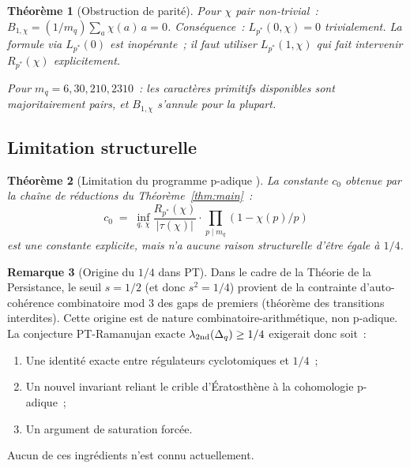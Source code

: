 \documentclass[11pt,a4paper]{article}
\newtheorem{theorem}{Théorème}[section]
\theoremstyle{definition}
\newtheorem{remark}[theorem]{Remarque}
\begin{document}
\begin{theorem}[Obstruction de parité]
\label{thm:parity_obstruction}
Pour $\chi$ pair non-trivial~: $B_{1,\chi} = (1/m_q)\sum_a \chi(a)\,a = 0$.
Conséquence~: $L_{p^*}(0,\chi) = 0$ trivialement. La formule via
$L_{p^*}(0)$ est inopérante~; il faut utiliser $L_{p^*}(1,\chi)$ qui
fait intervenir $R_{p^*}(\chi)$ explicitement.

\smallskip\noindent
Pour $m_q = 6, 30, 210, 2310$~: les caractères primitifs disponibles
sont majoritairement pairs, et $B_{1,\chi}$ s'annule pour la plupart.
\end{theorem}

\subsection{Limitation structurelle}

\begin{theorem}[Limitation du programme p-adique {\upshape [DIAG]}]
\label{thm:padic_limitation}
La constante $c_0$ obtenue par la chaîne de réductions du
Théorème~\ref{thm:main}~:
\begin{equation}
  c_0 \;=\; \inf_{q,\,\chi}
   \frac{R_{p^*}(\chi)}{|\tau(\chi)|}\cdot
   \prod_{p\mid m_q} (1-\chi(p)/p)
\end{equation}
est \emph{une} constante explicite, mais n'a \emph{aucune raison
structurelle} d'être égale à $1/4$.
\end{theorem}

\begin{remark}[Origine du $1/4$ dans PT]
Dans le cadre de la Théorie de la Persistance, le seuil $s = 1/2$
(et donc $s^2 = 1/4$) provient de la contrainte d'auto-cohérence
combinatoire mod 3 des gaps de premiers (théorème des transitions
interdites). Cette origine est de nature combinatoire-arithmétique,
non p-adique. La conjecture PT-Ramanujan exacte
$\lambda_{\rm 2nd}(\Delta_q) \geq 1/4$ exigerait donc soit~:
\begin{enumerate}
  \item Une identité exacte entre régulateurs cyclotomiques et $1/4$~;
  \item Un nouvel invariant reliant le crible d'Ératosthène à la
        cohomologie p-adique~;
  \item Un argument de saturation forcée.
\end{enumerate}
Aucun de ces ingrédients n'est connu actuellement.
\end{remark}

\end{document}
